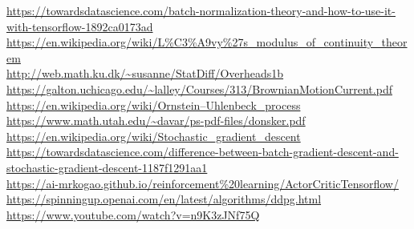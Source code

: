 \documentclass[11pt]{article} %
\numberwithin{equation}{subsection}
\begin{document}
\url{https://towardsdatascience.com/batch-normalization-theory-and-how-to-use-it-with-tensorflow-1892ca0173ad}\\

\url{https://en.wikipedia.org/wiki/L%C3%A9vy%27s_modulus_of_continuity_theorem}\\

\url{http://web.math.ku.dk/~susanne/StatDiff/Overheads1b}\\

\url{https://galton.uchicago.edu/~lalley/Courses/313/BrownianMotionCurrent.pdf}\\

\url{https://en.wikipedia.org/wiki/Ornstein–Uhlenbeck_process}\\

\url{https://www.math.utah.edu/~davar/ps-pdf-files/donsker.pdf}\\

\url{https://en.wikipedia.org/wiki/Stochastic_gradient_descent}\\

\url{https://towardsdatascience.com/difference-between-batch-gradient-descent-and-stochastic-gradient-descent-1187f1291aa1}\\

\url{https://ai-mrkogao.github.io/reinforcement%20learning/ActorCriticTensorflow/}\\

\url{https://spinningup.openai.com/en/latest/algorithms/ddpg.html}\\

\url{https://www.youtube.com/watch?v=n9K3zJNf75Q}
\end{document}
